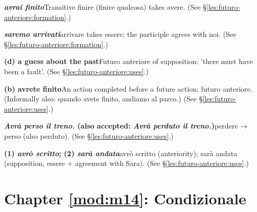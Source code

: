 \documentclass[11pt,a4paper,twoside,openright]{book}
\newcommand{\answerheading}[1]{\par\medskip\noindent{\sffamily\bfseries\small #1}\par\nopagebreak}
\begin{document}
\answerheading{\S\ref{les:futuro-anteriore} Futuro anteriore}\label{ans:futuro-anteriore}
\begin{answers}
\item\relax \textbf{\textit{avrai finito}}\newline Transitive finire (finire qualcosa) takes avere. {\color{muted}(See \S\ref{les:futuro-anteriore:formation}.)}
\item\relax \textbf{\textit{saremo arrivati}}\newline arrivare takes essere; the participle agrees with noi. {\color{muted}(See \S\ref{les:futuro-anteriore:formation}.)}
\item\relax \textbf{(d) a guess about the past}\newline Futuro anteriore of supposition: 'there must have been a fault'. {\color{muted}(See \S\ref{les:futuro-anteriore:uses}.)}
\item\relax \textbf{(b) avrete finito}\newline An action completed before a future action: futuro anteriore. (Informally also: quando avete finito, andiamo al parco.) {\color{muted}(See \S\ref{les:futuro-anteriore:uses}.)}
\item\relax \textbf{\textit{Avrà perso il treno.} {\color{muted}(also accepted: \textit{Avrà perduto il treno.})}}\newline perdere → perso (also perduto). {\color{muted}(See \S\ref{les:futuro-anteriore:uses}.)}
\item\relax \textbf{(1) \textit{avrò scritto}; (2) \textit{sarà andata}}\newline avrò scritto (anteriority); sarà andata (supposition, essere + agreement with Sara). {\color{muted}(See \S\ref{les:futuro-anteriore:uses}.)}
\end{answers}

\section*{Chapter \ref{mod:m14}: Condizionale}
\end{document}
